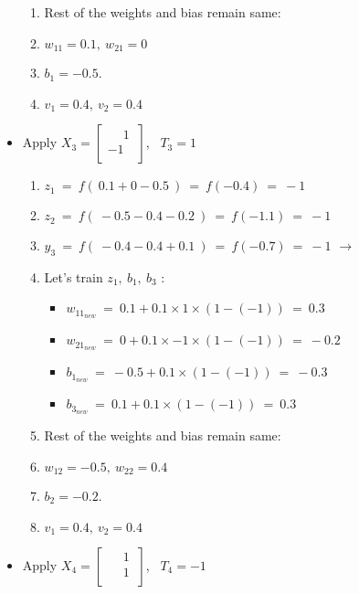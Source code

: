 \documentclass[12pt]{article}
\begin{document}
\begin{itemize}
{\begin{enumerate}
			\item Rest of the weights and bias remain same: 
			\item $w_{11} = 0.1,\  w_{21} = 0$  
			\item $b_1 = -0.5$.
			\item $v_1 = 0.4, \ v_2 = 0.4$
		\end{enumerate}
		
	}
	
	
	\item Apply $X_3 = \begin{bmatrix}
		\phantom{-}1\ \\ 	
		-1\ \\ 	
	\end{bmatrix}$, \  $T_3 = 1$
	
	{	
		\begin{enumerate}
			\item $z_1 \ = \ f(\ 0.1  +  0 - 0.5\ ) \ = \ f(-0.4) \ = \ -1$
			\item $z_2 \ = \ f(\ -0.5 - 0.4 - 0.2 \ ) \ = \ f(-1.1) \ = \ -1$
			\item $y_3 \ = \ f (\ -0.4 - 0.4 + 0.1 \ )\ = \ f(-0.7)  \ = \ -1$ $\rightarrow$ 
			
				\item Let's train $z_1,\ b_1,\ b_3$ :
			
			\begin{itemize}[label=$\rightarrow$]
				\item $w_{11_{new}}  \ = \ 0.1 + 0.1 \times 1 \times (1-(-1)) \ = \ 0.3$
				\item $w_{21_{new}}  \ = \ 0 + 0.1 \times -1 \times (1-(-1)) \ = \ -0.2$
				\item $b_{1_{new}} \ = \ -0.5 + 0.1 \times (1-(-1)) \ = \ -0.3$
				\item $b_{3_{new}} \ = \ 0.1 + 0.1 \times (1-(-1)) \ = \ 0.3$
			\end{itemize}
			
			\item Rest of the weights and bias remain same: 
			\item $w_{12} = -0.5,\  w_{22} = 0.4$  
			\item $b_2 = -0.2$.
			\item $v_1 = 0.4, \ v_2 = 0.4$
			
		\end{enumerate}
		
	}

	\item Apply $X_4 = \begin{bmatrix}
		\phantom{-}1\ \\ 	
		\phantom{-}1\ \\ 	
	\end{bmatrix}$, \  $T_4 = -1$
	

\end{itemize}
\end{document}

